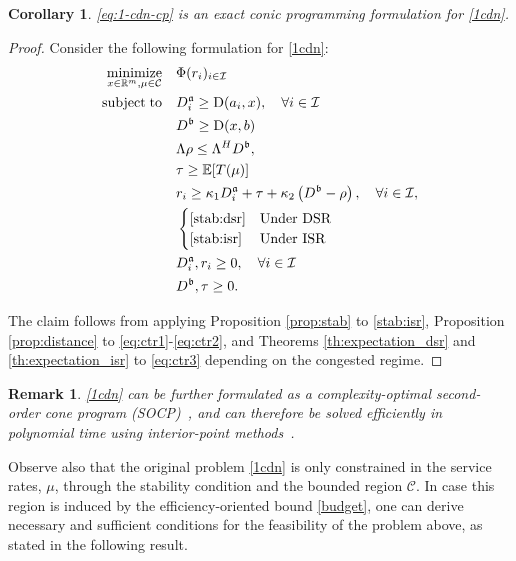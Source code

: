 \documentclass[a4paper,11pt,reqno]{amsart}
\newtheorem{corollary}{Corollary}
\newtheorem{remark}{Remark}
\DeclareMathOperator*{\minimize}{minimize}
\DeclareMathOperator{\st}{subject\; to}
\newcommand{\R}{\mathbb{R}}
\newcommand{\E}{\mathbb{E}}
\newcommand{\I}{\mathcal{I}}
\newcommand{\D}{\mathrm{D}}
\begin{document}
\begin{corollary}\label{coro:cp}
    \eqref{eq:1-cdn-cp} is an exact conic programming formulation for \eqref{1cdn}.
\end{corollary}

\begin{proof}
   Consider the following formulation for \eqref{1cdn}:
    \begin{align}
    \minimize_{x\in\R^m, \mu\in \mathcal{C}} \quad & \Phi(r_i)_{i\in\I}\nonumber\\
    \st \quad & D^{\frak a}_i \geq \D(a_i,x), \quad \forall i\in\I \label{eq:ctr1}\\
    & D^{\frak b}\geq \D(x,b)\label{eq:ctr2}\\
    & \Lambda\rho \leq \Lambda^H D^{\frak b},\nonumber\\
    & \tau\geq \E[T(\mu)]\label{eq:ctr3}\\
    & r_i\geq \kappa_1 D^{\frak a}_i+ \tau + \kappa_2 \left(D^{\frak b}-\rho\right) , \quad  \forall i\in\I,\nonumber\\
    & \begin{cases}
       \eqref{stab:dsr} & \text{Under DSR}\\
        \eqref{stab:isr} & \text{Under ISR}
    \end{cases}\nonumber\\
    & D^{\frak a}_i, r_i\geq 0, \quad \forall i\in \I\nonumber\\
    & D^{\frak b}, \tau\geq 0.\nonumber
\end{align}

The claim follows from applying Proposition \ref{prop:stab} to \eqref{stab:isr}, Proposition \ref{prop:distance} to \eqref{eq:ctr1}-\eqref{eq:ctr2}, and Theorems \ref{th:expectation_dsr} and \ref{th:expectation_isr} to \eqref{eq:ctr3} depending on the congested regime.
\end{proof}

\begin{remark}
\eqref{1cdn} can be further formulated as a complexity-optimal second-order cone program {\rm (SOCP)}~\citep{blanco2024minimal}, and can therefore be solved efficiently in polynomial time using interior-point methods~\citep[see, e.g.,][]{BoydVandenberghe2004}.
\end{remark}

Observe also that the original problem \eqref{1cdn} is only constrained in the service rates, $\mu$, through the stability condition and the bounded region $\mathcal{C}$. In case this region is induced by the efficiency-oriented bound \eqref{budget}, one can derive necessary and sufficient conditions for the feasibility of the problem above, as stated in the following result.
\end{document}
